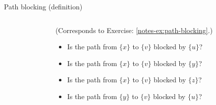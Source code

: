 \documentclass{beamer}
\begin{document}
\begin{frame}{Path blocking (definition)}
\begin{columns}
\begin{column}{0.25\textwidth}
   \end{column}\hspace{2mm}
   \begin{column}{0.75\textwidth}
    {\small (Corresponds to Exercise: \ref{notes-ex:path-blocking}.)}
    \begin{itemize}
     \item<2-> Is {the path from $\{x\}$ to $\{v\}$} blocked by {$\{u\}$}? 
     \item<3-> Is {the path from $\{x\}$ to $\{v\}$} blocked by {$\{y\}$}? 
     \item<4-> Is {the path from $\{x\}$ to $\{v\}$} blocked by {$\{z\}$}? 
     \item<5-> Is {the path from $\{y\}$ to $\{v\}$} blocked by {$\{u\}$}? 
    \end{itemize}
   \end{column}
  \end{columns} 
\end{frame}

\end{document}

